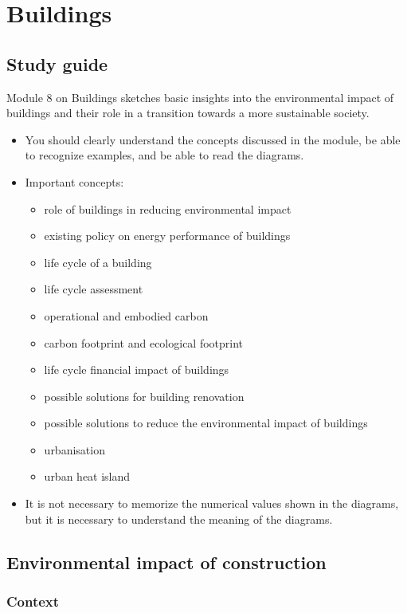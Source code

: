 \documentclass[../summary.tex]{subfiles}
\begin{document}
	
	\section{Buildings}
	
	\subsection{Study guide}
	
	Module 8 on Buildings sketches basic insights into the environmental impact of buildings and their role in a transition towards a more sustainable society. 
	
	\begin{itemize}
		\item You should clearly understand the concepts discussed in the module, be able to recognize examples, and be able to read the diagrams.
		\item Important concepts:
		\begin{itemize}
			\item role of buildings in reducing environmental impact
			\item existing policy on energy performance of buildings
			\item life cycle of a building
			\item life cycle assessment
			\item operational and embodied carbon
			\item carbon footprint and ecological footprint
			\item life cycle financial impact of buildings
			\item possible solutions for building renovation
			\item possible solutions to reduce the environmental impact of buildings
			\item urbanisation
			\item urban heat island
		\end{itemize}
		\item It is not necessary to memorize the numerical values shown in the diagrams, but it is necessary to understand the meaning of the diagrams.
	\end{itemize}
	
	\subsection{Environmental impact of construction}
	\subsubsection{Context}
	
\end{document}
